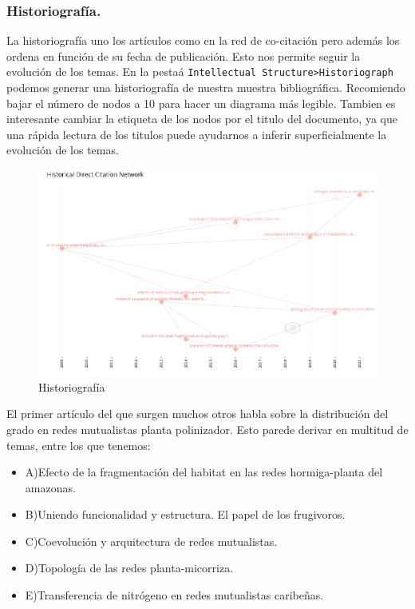 \documentclass[
]{article}
\providecommand{\tightlist}{%
  \setlength{\itemsep}{0pt}\setlength{\parskip}{0pt}}
\begin{document}
\hypertarget{historiografuxeda.}{%
\subsubsection{Historiografía.}\label{historiografuxeda.}}

La historiografía uno los artículos como en la red de co-citación pero
además los ordena en función de su fecha de publicación. Esto nos
permite seguir la evolución de los temas. En la pestaá
\texttt{Intellectual\ Structure\textgreater{}Historiograph} podemos
generar una historiografía de nuestra muestra bibliográfica. Recomiendo
bajar el número de nodos a 10 para hacer un diagrama más legible.
Tambien es interesante cambiar la etiqueta de los nodos por el titulo
del documento, ya que una rápida lectura de los titulos puede ayudarnos
a inferir superficialmente la evolución de los temas.

\begin{figure}
\centering
\includegraphics{Historiografia.png}
\caption{Historiografía}
\end{figure}

El primer artículo del que surgen muchos otros habla sobre la
distribución del grado en redes mutualistas planta polinizador. Esto
parede derivar en multitud de temas, entre los que tenemos:

\begin{itemize}
\tightlist
\item
  A)Efecto de la fragmentación del habitat en las redes hormiga-planta
  del amazonas.
\item
  B)Uniendo funcionalidad y estructura. El papel de los frugivoros.
\item
  C)Coevolución y arquitectura de redes mutualistas.
\item
  D)Topología de las redes planta-micorriza.
\item
  E)Transferencia de nitrógeno en redes mutualistas caribeñas.
\end{itemize}
\end{document}
